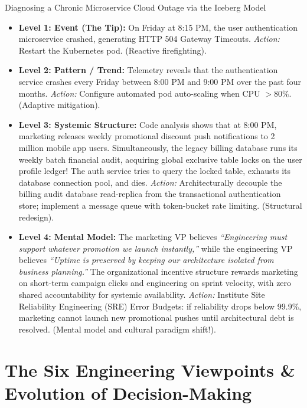 \begin{examplebox}{Diagnosing a Chronic Microservice Cloud Outage via the Iceberg Model}
\begin{itemize}[leftmargin=1.5em]
    \item \textbf{Level 1: Event (The Tip):} On Friday at 8:15 PM, the user authentication microservice crashed, generating HTTP 504 Gateway Timeouts. \textit{Action:} Restart the Kubernetes pod. (Reactive firefighting).
    \item \textbf{Level 2: Pattern / Trend:} Telemetry reveals that the authentication service crashes every Friday between 8:00 PM and 9:00 PM over the past four months. \textit{Action:} Configure automated pod auto-scaling when CPU $> 80\%$. (Adaptive mitigation).
    \item \textbf{Level 3: Systemic Structure:} Code analysis shows that at 8:00 PM, marketing releases weekly promotional discount push notifications to 2 million mobile app users. Simultaneously, the legacy billing database runs its weekly batch financial audit, acquiring global exclusive table locks on the user profile ledger! The auth service tries to query the locked table, exhausts its database connection pool, and dies. \textit{Action:} Architecturally decouple the billing audit database read-replica from the transactional authentication store; implement a message queue with token-bucket rate limiting. (Structural redesign).
    \item \textbf{Level 4: Mental Model:} The marketing VP believes \textit{``Engineering must support whatever promotion we launch instantly,''} while the engineering VP believes \textit{``Uptime is preserved by keeping our architecture isolated from business planning.''} The organizational incentive structure rewards marketing on short-term campaign clicks and engineering on sprint velocity, with zero shared accountability for systemic availability. \textit{Action:} Institute Site Reliability Engineering (SRE) Error Budgets: if reliability drops below 99.9\%, marketing cannot launch new promotional pushes until architectural debt is resolved. (Mental model and cultural paradigm shift!).
\end{itemize}
\end{examplebox}

\section{The Six Engineering Viewpoints \& Evolution of Decision-Making}
\label{sec:six_viewpoints}

